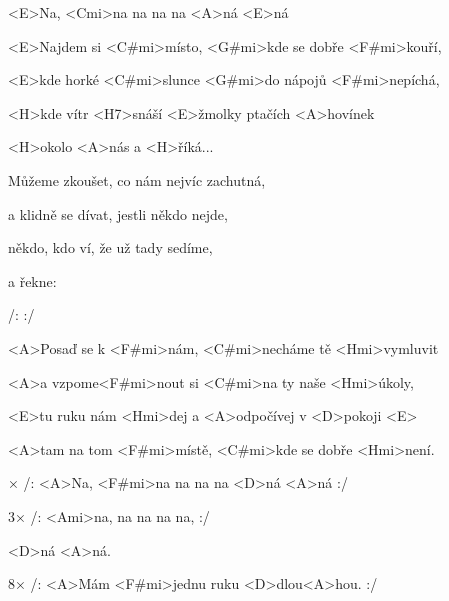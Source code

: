 

<E>Na, <Cmi>na na na na <A>ná <E>ná

\zs
<E>Najdem si <C#mi>místo, <G#mi>kde se dobře <F#mi>kouří,

<E>kde horké <C#mi>slunce <G#mi>do nápojů <F#mi>nepíchá,

<H>kde vítr <H7>snáší <E>žmolky ptačích <A>hovínek

<H>okolo <A>nás a <H>říká...
\ks

\zs
Můžeme zkoušet, co nám nejvíc zachutná,

a klidně se dívat, jestli někdo nejde,

někdo, kdo ví, že už tady sedíme,

a řekne: 
\ks

\zr
/:  :/
\kr

\zs
<A>Posaď se k <F#mi>nám, <C#mi>necháme tě <Hmi>vymluvit

<A>a vzpome<F#mi>nout si <C#mi>na ty naše <Hmi>úkoly,

<E>tu ruku nám <Hmi>dej a <A>odpočívej v <D>pokoji 
<E>

\bigskip

<A>tam na tom <F#mi>místě, <C#mi>kde se dobře <Hmi>není.
\ks

× /: <A>Na, <F#mi>na na na na <D>ná <A>ná :/

3× /: <Ami>na, na na na na, :/

<D>ná <A>ná.

8× /: <A>Mám <F#mi>jednu ruku <D>dlou<A>hou. :/
\kr

\kp





